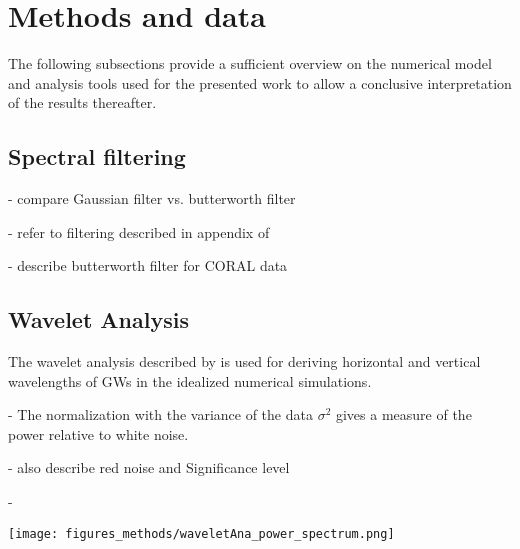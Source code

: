\chapter{Methods and data}
\label{sec:methods}
The following subsections provide a sufficient overview on the numerical model and analysis tools used for the presented work to allow a conclusive interpretation of the results thereafter.

\section{Spectral filtering}
\label{sec:spectral_filter}


- compare Gaussian filter vs. butterworth filter

- refer to filtering described in appendix of \textcite[]{kruse_gravity_2015}

- describe butterworth filter for CORAL data

\section{Wavelet Analysis}
\label{sec:wavelet}
The wavelet analysis described by \textcite{torrence_practical_1998} is used for deriving horizontal and vertical wavelengths of GWs in the idealized numerical simulations. 



- The normalization with the variance of the data $\sigma^2$ gives a measure of the power relative to white noise. 

- also describe red noise and Significance level

- 

\begin{figure*}[t]
    \centering
    \texttt{[image: figures\_methods/waveletAna\_power\_spectrum.png]}
    \caption{}
    \label{fig:wavelet_example}
\end{figure*}



